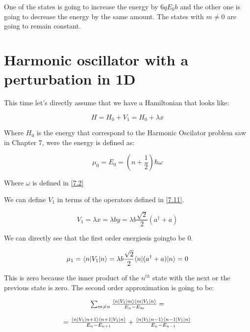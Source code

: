 One of the states is going to increase the energy by $6 q E_0 b$ and the other one is going to decrease the energy by the same amount. The states with $m\neq0$ are going to remain constant.

\section{Harmonic oscillator with a perturbation in 1D}

This time let's directly assume that we have a Hamiltonian that looks like:

\begin{equation}
  H = H_0 + V_1 = H_0 + \lambda x
\end{equation}

Where $H_0$ is the energy that correspond to the Harmonic Oscilator problem saw in Chapter 7, were the energy is defined as:

\begin{equation}
  \mu_0 = E_0 = \left(n+\frac{1}{2}\right) \hbar \omega
\end{equation}

Where $\omega$ is defined in \ref{7.2}

We can define $V_1$ in terms of the operators defined in \ref{7.11}.

\begin{equation}
  V_1 = \lambda x = \lambda b y = \lambda b \frac{\sqrt{2}}{2} (a^\dagger + a)
\end{equation}

We can directly see that the first order energiesis goingto be 0.

\begin{equation}
  \mu_1 = \langle n\rvert V_1\lvert n\rangle = \lambda b \frac{\sqrt{2}}{2} \langle n\rvert(a^\dagger + a)\lvert n\rangle = 0
\end{equation}

This is zero because the inner product of the $n^{th}$ state with the next or the previous state is zero. The second order approximation is going to be:

\begin{equation}
\begin{array}{c}
  \sum_{m \neq n} \frac{\langle n\rvert V_1\lvert m\rangle\langle m\rvert V_1\lvert n\rangle}{E_n-E_m} =
  \\

  \\
  = \frac{\langle n\rvert V_1\lvert n+1\rangle\langle n+1\rvert V_1\lvert n\rangle}{E_{n}-E_{n+1}} + \frac{\langle n\rvert V_1\lvert n-1\rangle\langle n-1\rvert V_1\lvert n\rangle}{E_{n}-E_{n-1}}
\end{array}
\end{equation}

